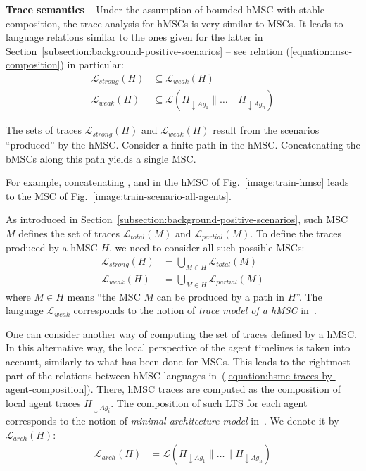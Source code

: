 \noindent \textbf{Trace semantics} -- Under the assumption of bounded hMSC with stable composition, the trace analysis for hMSCs is very similar to MSCs. It leads to language relations similar to the ones given for the latter in Section~\ref{subsection:background-positive-scenarios} -- see relation (\ref{equation:msc-composition}) in particular:
\begin{align}
\mathcal{L}_{strong}(H) & \subseteq \mathcal{L}_{weak}(H) \\
\mathcal{L}_{weak}(H) & \subseteq \mathcal{L}(H_{\downarrow Ag_1} \parallel \ldots \parallel H_{\downarrow Ag_n})
\label{equation:hsmc-traces-by-agent-composition}
\end{align}

The sets of traces $\mathcal{L}_{strong}(H)$ and $\mathcal{L}_{weak}(H)$ result from the scenarios ``produced'' by the hMSC. Consider a finite path in the hMSC. Concatenating the bMSCs along this path yields a single MSC. 

For example, concatenating ,  and  in the hMSC of Fig.~\ref{image:train-hmsc} leads to the MSC of Fig.~\ref{image:train-scenario-all-agents}. 

As introduced in Section~\ref{subsection:background-positive-scenarios}, such MSC $M$ defines the set of traces $\mathcal{L}_{total}(M)$ and $\mathcal{L}_{partial}(M)$. To define the traces produced by a hMSC $H$, we need to consider all such possible MSCs: 
\begin{align}
\mathcal{L}_{strong}(H) &= \bigcup_{M \in H} \mathcal{L}_{total}(M) \\
\mathcal{L}_{weak}(H) &= \bigcup_{M \in H} \mathcal{L}_{partial}(M)
\end{align}
\noindent where $M \in H$ means ``the MSC $M$ can be produced by a path in $H$''. The language $\mathcal{L}_{weak}$ corresponds to the notion of \emph{trace model of a hMSC} in~\cite{Uchitel:2004}.

One can consider another way of computing the set of traces defined by a hMSC. In this alternative way, the local perspective of the agent timelines is taken into account, similarly to what has been done for MSCs. This leads to the rightmost part of the relations between hMSC languages in~(\ref{equation:hsmc-traces-by-agent-composition}). There, hMSC traces are computed as the composition of local agent traces $H_{\downarrow Ag_i}$. The composition of such LTS for each agent corresponds to the notion of \emph{minimal architecture model} in~\cite{Uchitel:2004}. We denote it by $\mathcal{L}_{arch}(H)$:
\begin{align}
\mathcal{L}_{arch}(H) &= \mathcal{L}(H_{\downarrow Ag_1} \parallel \ldots \parallel H_{\downarrow Ag_n})
\end{align}

